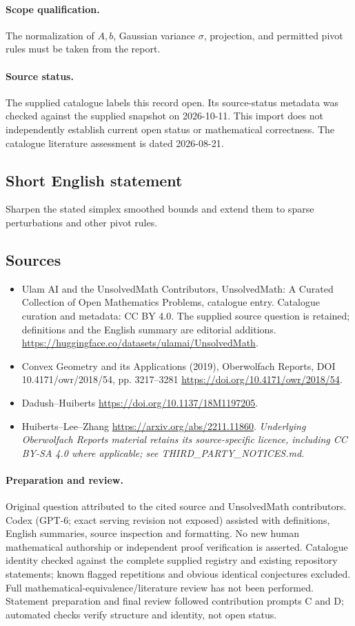 \documentclass[11pt]{article}
\begin{document}
\paragraph{Scope qualification.}
The normalization of $A,b$, Gaussian variance $\sigma$, projection, and permitted pivot rules must be taken from the report.
\paragraph{Source status.}
The supplied catalogue labels this record open. Its source-status metadata was checked against the supplied snapshot on 2026-10-11. This import does not independently establish current open status or mathematical correctness. The catalogue literature assessment is dated 2026-08-21.
\subsection{Short English statement}
Sharpen the stated simplex smoothed bounds and extend them to sparse perturbations and other pivot rules.
\subsection{Sources}
\begin{itemize}
\item[S1] Ulam AI and the UnsolvedMath Contributors, UnsolvedMath: A Curated Collection of Open Mathematics Problems, catalogue entry. Catalogue curation and metadata: CC BY 4.0. The supplied source question is retained; definitions and the English summary are editorial additions.
\url{https://huggingface.co/datasets/ulamai/UnsolvedMath}.
\item[S2] Convex Geometry and its Applications (2019), Oberwolfach Reports, DOI 10.4171/owr/2018/54, pp. 3217--3281
\url{https://doi.org/10.4171/owr/2018/54}.
\item[S3] Dadush--Huiberts
\url{https://doi.org/10.1137/18M1197205}.
\item[S4] Huiberts--Lee--Zhang
\url{https://arxiv.org/abs/2211.11860}.
\textit{Underlying Oberwolfach Reports material retains its source-specific licence, including CC BY-SA 4.0 where applicable; see THIRD\_PARTY\_NOTICES.md.}
\end{itemize}
\paragraph{Preparation and review.}
Original question attributed to the cited source and UnsolvedMath contributors. Codex (GPT-6; exact serving revision not exposed) assisted with definitions, English summaries, source inspection and formatting. No new human mathematical authorship or independent proof verification is asserted. Catalogue identity checked against the complete supplied registry and existing repository statements; known flagged repetitions and obvious identical conjectures excluded. Full mathematical-equivalence/literature review has not been performed. Statement preparation and final review followed contribution prompts C and D; automated checks verify structure and identity, not open status.
\label{end:statement}
\end{document}
